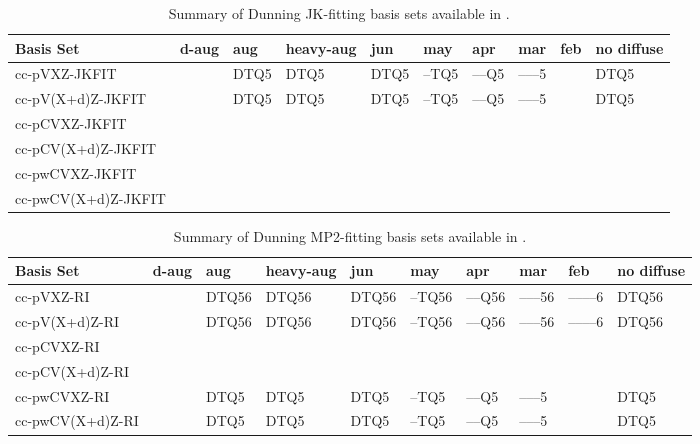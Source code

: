 \begin{table}[!htbp]
\begin{footnotesize}
\caption{Summary of Dunning JK-fitting basis sets available in \PSIfour.} \label{table:basisDunningJKFIT}
\parsep 10pt
\begin{center}
\begin{tabular}{llllllllll} 
\hline\hline
Basis Set            & d-aug & aug & heavy-aug\cite{basisnote1} & jun & may & apr & mar & feb & no diffuse \\ 
\hline
cc-pVXZ-JKFIT\cite{basisnote2}   &  & DTQ5  & DTQ5  & DTQ5  & --TQ5  & --{}--Q5  & --{}--{}--5  &  & DTQ5  \\
cc-pV(X+d)Z-JKFIT                &  & DTQ5  & DTQ5  & DTQ5  & --TQ5  & --{}--Q5  & --{}--{}--5  &  & DTQ5  \\
cc-pCVXZ-JKFIT\cite{basisnote2}  &  &  &  &  &  &  &  &  &  \\
cc-pCV(X+d)Z-JKFIT               &  &  &  &  &  &  &  &  &  \\
cc-pwCVXZ-JKFIT\cite{basisnote2} &  &  &  &  &  &  &  &  &  \\
cc-pwCV(X+d)Z-JKFIT              &  &  &  &  &  &  &  &  &  \\
\hline\hline
\end{tabular}
\end{center}
\end{footnotesize}
\end{table}


\begin{table}[!htbp]
\begin{footnotesize}
\caption{Summary of Dunning MP2-fitting basis sets available in \PSIfour.} \label{table:basisDunningMP2FIT}
\parsep 10pt
\begin{center}
\begin{tabular}{llllllllll} 
\hline\hline
Basis Set            & d-aug & aug & heavy-aug\cite{basisnote1} & jun & may & apr & mar & feb & no diffuse \\ 
\hline
cc-pVXZ-RI           &  & DTQ56 & DTQ56 & DTQ56 & --TQ56 & --{}--Q56 & --{}--{}--56 & --{}--{}--{}--6 & DTQ56 \\
cc-pV(X+d)Z-RI       &  & DTQ56 & DTQ56 & DTQ56 & --TQ56 & --{}--Q56 & --{}--{}--56 & --{}--{}--{}--6 & DTQ56 \\
cc-pCVXZ-RI          &  &  &  &  &  &  &  &  &  \\
cc-pCV(X+d)Z-RI      &  &  &  &  &  &  &  &  &  \\
cc-pwCVXZ-RI         &  & DTQ5  & DTQ5  & DTQ5  & --TQ5  & --{}--Q5  & --{}--{}--5  &                 & DTQ5  \\
cc-pwCV(X+d)Z-RI     &  & DTQ5  & DTQ5  & DTQ5  & --TQ5  & --{}--Q5  & --{}--{}--5  &                 & DTQ5  \\
\hline\hline
\end{tabular}
\end{center}
\end{footnotesize}
\end{table}


